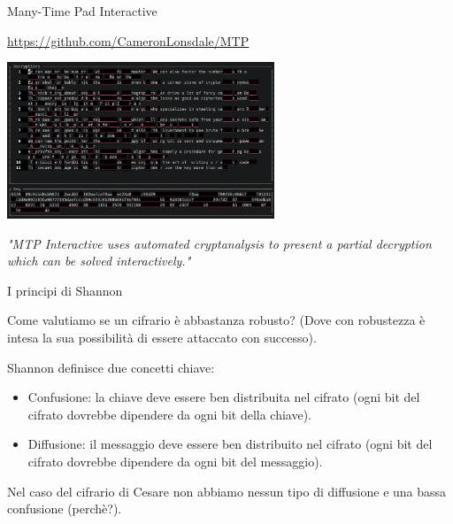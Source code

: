 \documentclass[handout, xcolor=dvipsnames,aspectratio=169]{beamer}
\begin{document}
\begin{frame}{Many-Time Pad Interactive}
  
  \url{https://github.com/CameronLonsdale/MTP}
  
  \smallskip
  
  \centering\includegraphics[width=8cm]{img/MTP} 
 
  \smallskip
  
  \textit{"MTP Interactive uses automated cryptanalysis to present a partial decryption which can be solved interactively."}
  
   
\end{frame}

\begin{frame}{I principi di Shannon}

  \pause
  Come valutiamo se un cifrario è abbastanza robusto? (Dove con robustezza è intesa la sua possibilità di essere attaccato con successo). 
  
  \medskip
  \pause
  Shannon definisce due concetti chiave:
  
  \begin{itemize}
    \item Confusione: la chiave deve essere ben distribuita nel cifrato (ogni bit del cifrato dovrebbe dipendere da ogni bit della chiave).
    \item Diffusione: il messaggio deve essere ben distribuito nel cifrato (ogni bit del cifrato dovrebbe dipendere da ogni bit del messaggio).
  \end{itemize}
  
  \medskip
  \pause
  
  Nel caso del cifrario di Cesare non abbiamo nessun tipo di diffusione e una bassa confusione (perchè?).
  
\end{frame}
\end{document}
